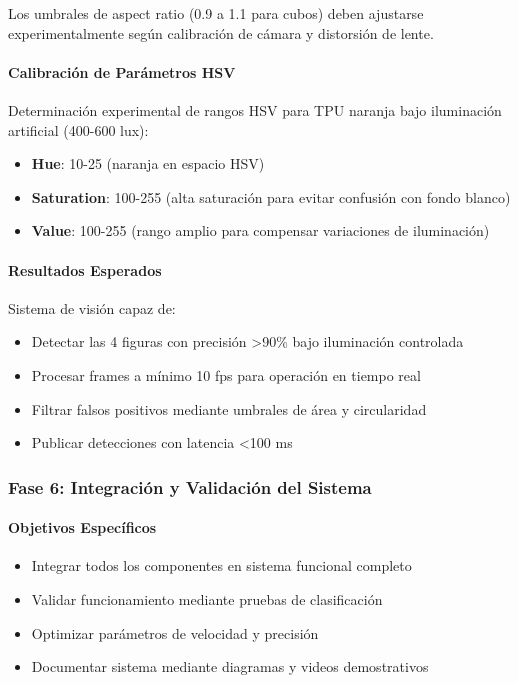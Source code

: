 Los umbrales de aspect ratio (0.9 a 1.1 para cubos) deben ajustarse experimentalmente según calibración de cámara y distorsión de lente.

\paragraph{Calibración de Parámetros HSV}

Determinación experimental de rangos HSV para TPU naranja bajo iluminación artificial (400-600 lux):

\begin{itemize}
    \item \textbf{Hue}: 10-25 (naranja en espacio HSV)
    \item \textbf{Saturation}: 100-255 (alta saturación para evitar confusión con fondo blanco)
    \item \textbf{Value}: 100-255 (rango amplio para compensar variaciones de iluminación)
\end{itemize}

\paragraph{Resultados Esperados}

Sistema de visión capaz de:
\begin{itemize}
    \item Detectar las 4 figuras con precisión >90\% bajo iluminación controlada
    \item Procesar frames a mínimo 10 fps para operación en tiempo real
    \item Filtrar falsos positivos mediante umbrales de área y circularidad
    \item Publicar detecciones con latencia <100 ms
\end{itemize}

\subsubsection{Fase 6: Integración y Validación del Sistema}

\paragraph{Objetivos Específicos}
\begin{itemize}
    \item Integrar todos los componentes en sistema funcional completo
    \item Validar funcionamiento mediante pruebas de clasificación
    \item Optimizar parámetros de velocidad y precisión
    \item Documentar sistema mediante diagramas y videos demostrativos
\end{itemize}

